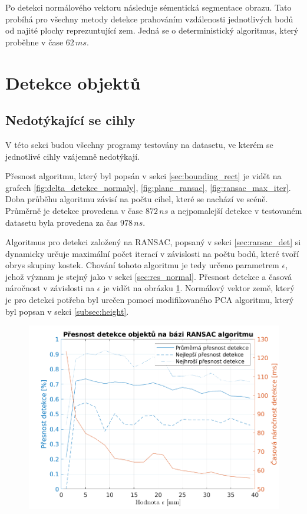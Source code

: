 \documentclass[twoside]{ctuthesis}
\begin{document}
Po detekci normálového vektoru následuje sémentická segmentace obrazu. Tato probíhá pro všechny metody detekce prahováním vzdálenosti jednotlivých bodů od najité plochy reprezuntující zem. Jedná se o deterministický algoritmus, který proběhne v čase $62\,ms$.

\section{Detekce objektů}
\subsection{Nedotýkající se cihly}
V této sekci budou všechny programy testovány na datasetu, ve kterém se jednotlivé cihly vzájemně nedotýkají.

Přesnost algoritmu, který byl popsán v sekci \ref{sec:bounding_rect} je vidět na grafech \ref{fig:delta_detekce_normaly}, \ref{fig:plane_ransac}, \ref{fig:ransac_max_iter}. Doba průběhu algoritmu závisí na počtu cihel, které se nachází ve scéně. Průměrně je detekce provedena v čase $872\,ns$ a nejpomalejší detekce v testovaném datasetu byla provedena za čas $978\,ns$.

Algoritmus pro detekci založený na RANSAC, popsaný v sekci \ref{sec:ransac_det} si dynamicky určuje maximální počet iterací v závislosti na počtu bodů, které tvoří obrys skupiny kostek. Chování tohoto algoritmu je tedy určeno parametrem $\epsilon$, jehož význam je stejný jako v sekci \ref{sec:res_normal}. Přesnost detekce a časová náročnost v závislosti na $\epsilon$ je vidět na obrázku \ref{fig:ransac_obj_det}. Normálový vektor země, který je pro detekci potřeba byl urečen pomocí modifikovaného PCA algoritmu, který byl popsan v sekci \ref{subsec:height}.

\begin{figure}
    \centering
    \includegraphics[width = \linewidth]{pictures/ransac_obj_det.png}
    \caption{}
    \label{fig:ransac_obj_det}
\end{figure}
\end{document}
